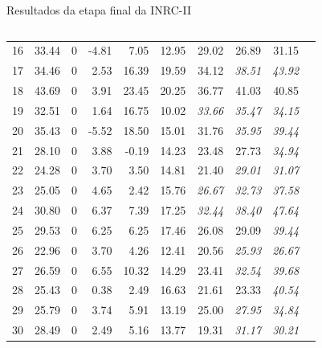 \documentclass[8pt,mathserif,professionalfont]{beamer}
\begin{document}
\begin{frame}{Resultados da etapa final da INRC-II}
\begin{columns}
\begin{column}{0.5\textwidth}
\begin{table}[!]
{\begin{tabular}{rlrrrrrrrr}
   16 &  33.44 &   0 & -4.81 & 7.05 & 12.95 & 29.02 & 26.89 & 31.15 \\
   17 &  34.46 &   0 & 2.53 & 16.39 & 19.59 & 34.12 & \it 38.51 & \it 43.92 \\
   18 &  43.69 &   0 & 3.91 & 23.45 & 20.25 & 36.77 & 41.03 & 40.85 \\
   19 &  32.51 &   0 & 1.64 & 16.75 & 10.02 & \it 33.66 & \it 35.47 & \it 34.15 \\
   20 &  35.43 &   0 & -5.52 & 18.50 & 15.01 & 31.76 & \it 35.95 & \it 39.44 \\
   21 &  28.10 &   0 & 3.88 & -0.19 & 14.23 & 23.48 & 27.73 & \it 34.94 \\
   22 &  24.28 &   0 & 3.70 & 3.50 & 14.81 & 21.40 & \it 29.01 & \it 31.07 \\
   23 &  25.05 &   0 & 4.65 & 2.42 & 15.76 & \it 26.67 & \it 32.73 & \it 37.58 \\
   24 &  30.80 &   0 & 6.37 & 7.39 & 17.25 & \it 32.44 & \it 38.40 & \it 47.64 \\
   25 &  29.53 &   0 & 6.25 & 6.25 & 17.46 & 26.08 & 29.09 & \it 39.44 \\
   26 &  22.96 &   0 & 3.70 & 4.26 & 12.41 & 20.56 & \it 25.93 & \it 26.67 \\
   27 &  26.59 &   0 & 6.55 & 10.32 & 14.29 & 23.41 & \it 32.54 & \it 39.68 \\
   28 &  25.43 &   0 & 0.38 & 2.49 & 16.63 & 21.61 & 23.33 & \it 40.54 \\
   29 &  25.79 &   0 & 3.74 & 5.91 & 13.19 & 25.00 & \it 27.95 & \it 34.84 \\
   30 &  28.49 &   0 & 2.49 & 5.16 & 13.77 & 19.31 & \it 31.17 & \it 30.21 \\
   \bottomrule
\end{tabular}
}
\end{table}


\end{column}
\end{columns}
\end{frame}
\end{document}
